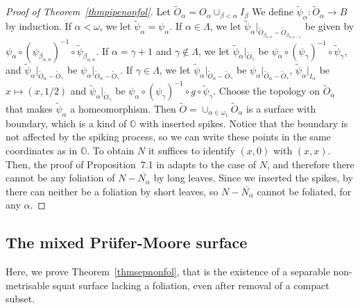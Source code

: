 \documentclass{amsart}
\begin{document}
\begin{proof}[Proof of Theorem~\ref{thmpipenonfol}]
{Let $\widetilde{O}_\alpha=O_\alpha\cup_{\beta<\alpha}I_\beta$
We define $\widetilde{\psi}_\alpha:\widetilde{O}_\alpha\to B$
by induction. If $\alpha < \omega$, we let
$\widetilde{\psi}_\alpha =\psi_\alpha$. If $\alpha\in\Lambda$,
we let
$\widetilde{\psi}_\alpha|_{\widetilde{O}_{\beta_{\alpha,n}}-\widetilde{O}_{\beta_{\alpha,n-1}}}$ 
be given by
$\psi_\alpha\circ(\psi_{\beta_{\alpha,n}})^{-1}\circ\widetilde{\psi}_{\beta_{\alpha,n}}$.
If $\alpha=\gamma+1$ and $\gamma\notin\Lambda$, we let
$\widetilde{\psi}_\alpha|_{\widetilde{O}_\gamma}$ be
$\psi_\alpha\circ(\psi_\gamma)^{-1}\circ\widetilde{\psi}_\gamma$,
and 
$\widetilde{\psi}_\alpha|_{\widetilde{O}_\alpha - \widetilde{O}_\gamma}$ be $\psi_\alpha|_{\widetilde{O}_\alpha- \widetilde{O}_\gamma}$. 
If $\gamma\in\Lambda$, we let
$\widetilde{\psi}_\alpha|_{\widetilde{O}_\alpha - \widetilde{O}_\gamma}$ be $\psi_\alpha|_{\widetilde{O}_\alpha - \widetilde{O}_\gamma}$,
$\widetilde{\psi}_\alpha|_{I_\alpha}$ be $x\mapsto(x,1/2)$ and
$\widetilde{\psi}_\alpha|_{\widetilde{O}_\gamma}$ be
$\psi_\alpha\circ(\psi_\gamma)^{-1}\circ g\circ\widetilde{\psi}_\gamma$. 
Choose the topology on $\widetilde{O}_\alpha$ that makes $\widetilde{\psi}_\alpha$ a
homeomorphism. Then
$\widetilde{O}=\cup_{\alpha\in\omega_1}\widetilde{O}_\alpha$
is a surface with boundary, which is a kind of ${\mathbb{O}}$ with
inserted spikes. Notice that the boundary is not affected by
the spiking process, so we can write these points in the same
coordinates as in ${\mathbb{O}}$. To obtain $N$ it suffices to identify
$(x,0)$ with $(x,x)$. Then, the proof of Proposition~7.1 in
\cite{BGG} adapts to the case of $N$, and therefore there
cannot be any foliation of $N-{\overline{{N_\alpha}}}$ by long leaves. Since
we inserted the spikes, by \cite[Proposition~5.3]{BGG} there
can neither be a foliation by short leaves, so $N-{\overline{{N_\alpha}}}$
cannot be foliated, for any $\alpha$.}\fi 
\end{proof}

\subsection{The mixed Pr\"ufer-Moore surface}\label{mixed_Pruefer_Moore}

Here, we prove Theorem~\ref{thmsepnonfol}, that is the existence of a separable non-metrisable squat surface lacking a foliation, even after removal of a compact subset.
\end{document}
